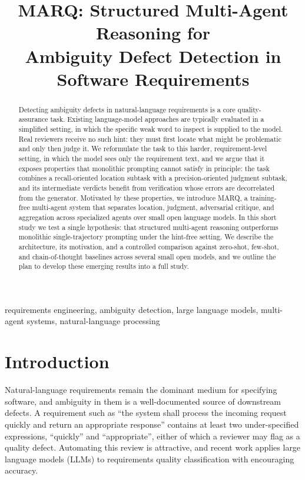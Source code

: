 \documentclass[10pt,conference]{IEEEtran}
\begin{document}
\title{MARQ: Structured Multi-Agent Reasoning for\\ Ambiguity Defect Detection in Software Requirements}

\author{
}

\maketitle

\begin{abstract}
Detecting ambiguity defects in natural-language requirements is a core quality-assurance task. Existing language-model approaches are typically evaluated in a simplified setting, in which the specific weak word to inspect is supplied to the model. Real reviewers receive no such hint: they must first locate what might be problematic and only then judge it. We reformulate the task to this harder, requirement-level setting, in which the model sees only the requirement text, and we argue that it exposes properties that monolithic prompting cannot satisfy in principle: the task combines a recall-oriented location subtask with a precision-oriented judgment subtask, and its intermediate verdicts benefit from verification whose errors are decorrelated from the generator. Motivated by these properties, we introduce MARQ, a training-free multi-agent system that separates location, judgment, adversarial critique, and aggregation across specialized agents over small open language models. In this short study we test a single hypothesis: that structured multi-agent reasoning outperforms monolithic single-trajectory prompting under the hint-free setting. We describe the architecture, its motivation, and a controlled comparison against zero-shot, few-shot, and chain-of-thought baselines across several small open models, and we outline the plan to develop these emerging results into a full study.
\end{abstract}

\begin{IEEEkeywords}
requirements engineering, ambiguity detection, large language models, multi-agent systems, natural-language processing
\end{IEEEkeywords}

\section{Introduction}
Natural-language requirements remain the dominant medium for specifying software, and ambiguity in them is a well-documented source of downstream defects. A requirement such as ``the system shall process the incoming request quickly and return an appropriate response'' contains at least two under-specified expressions, ``quickly'' and ``appropriate'', either of which a reviewer may flag as a quality defect. Automating this review is attractive, and recent work applies large language models (LLMs) to requirements quality classification with encouraging accuracy.
\end{document}
